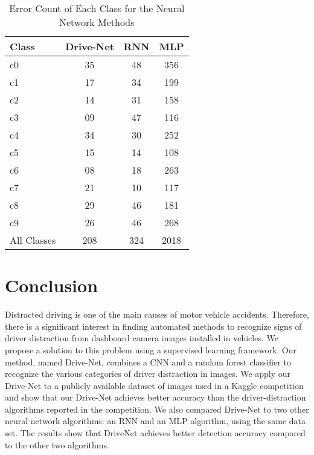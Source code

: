 \begin{table}[]
\centering
\caption{Error Count of Each Class for the Neural Network Methods}%
\label{tab:drive-net.table.2}
\begin{tabular}{@{}lccc@{}}
\toprule
\rowcolor[HTML]{FFFFFF}
Class       & Drive-Net & RNN & MLP  \\ \midrule
c0          & 35        & 48  & 356  \\
c1          & 17        & 34  & 199  \\
c2          & 14        & 31  & 158  \\
c3          & 09        & 47  & 116  \\
c4          & 34        & 30  & 252  \\
c5          & 15        & 14  & 108  \\
c6          & 08        & 18  & 263  \\
c7          & 21        & 10  & 117  \\
c8          & 29        & 46  & 181  \\
c9          & 26        & 46  & 268  \\
\rowcolor[HTML]{EFEFEF}
All Classes & 208       & 324 & 2018 \\ \bottomrule
\end{tabular}
\end{table}

\section{Conclusion}
Distracted driving is one of the main causes of motor vehicle accidents. Therefore, there is a significant interest in finding automated methods to recognize signs of driver distraction from dashboard camera images installed in vehicles. We propose a solution to this problem using a supervised learning framework. Our method, named Drive-Net, combines a CNN and a random forest classifier to recognize the various categories of driver distraction in images. We apply our Drive-Net to a publicly available dataset of images used in a Kaggle competition and show that our Drive-Net achieves better accuracy than the driver-distraction algorithms reported in the competition. We also compared Drive-Net to two other neural network algorithms: an RNN and an MLP algorithm, using the same data set. The results show that DriveNet achieves better detection accuracy compared to the other two algorithms.
